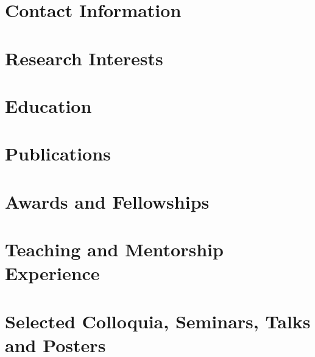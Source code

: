 \documentclass[margin,line]{res}
\begin{document}
\centerline{\LARGE {}}
\bigskip


\begin{resume}
\section{\sc Contact Information}
    
\section{\sc Research Interests}
    
\section{\sc Education}
    
\section{\sc Publications}
    
\section{\sc Awards and Fellowships}
    
\section{\sc Teaching and Mentorship Experience}
    
%     
\section{\sc Selected Colloquia, Seminars, Talks and Posters}
    
%     
%     

\end{resume}
\end{document}
